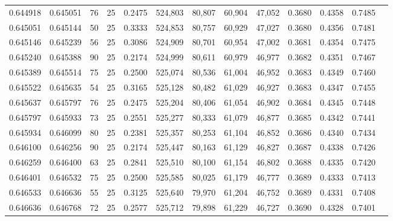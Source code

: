 \begin{tabular}{rrrrrrrrrrrrr}
0.644918 & 0.645051 &    76 &  25 &                                     0.2475 & 524,803 &  80,807 &  60,904 &  47,052 & 0.3680 & 0.4358 & 0.7485 \\
0.645051 & 0.645144 &    50 &  25 &                                     0.3333 & 524,853 &  80,757 &  60,929 &  47,027 & 0.3680 & 0.4356 & 0.7481 \\
0.645146 & 0.645239 &    56 &  25 &                                     0.3086 & 524,909 &  80,701 &  60,954 &  47,002 & 0.3681 & 0.4354 & 0.7475 \\
0.645240 & 0.645388 &    90 &  25 &                                     0.2174 & 524,999 &  80,611 &  60,979 &  46,977 & 0.3682 & 0.4351 & 0.7467 \\
0.645389 & 0.645514 &    75 &  25 &                                     0.2500 & 525,074 &  80,536 &  61,004 &  46,952 & 0.3683 & 0.4349 & 0.7460 \\
0.645522 & 0.645635 &    54 &  25 &                                     0.3165 & 525,128 &  80,482 &  61,029 &  46,927 & 0.3683 & 0.4347 & 0.7455 \\
0.645637 & 0.645797 &    76 &  25 &                                     0.2475 & 525,204 &  80,406 &  61,054 &  46,902 & 0.3684 & 0.4345 & 0.7448 \\
0.645797 & 0.645933 &    73 &  25 &                                     0.2551 & 525,277 &  80,333 &  61,079 &  46,877 & 0.3685 & 0.4342 & 0.7441 \\
0.645934 & 0.646099 &    80 &  25 &                                     0.2381 & 525,357 &  80,253 &  61,104 &  46,852 & 0.3686 & 0.4340 & 0.7434 \\
0.646100 & 0.646256 &    90 &  25 &                                     0.2174 & 525,447 &  80,163 &  61,129 &  46,827 & 0.3687 & 0.4338 & 0.7426 \\
0.646259 & 0.646400 &    63 &  25 &                                     0.2841 & 525,510 &  80,100 &  61,154 &  46,802 & 0.3688 & 0.4335 & 0.7420 \\
0.646401 & 0.646532 &    75 &  25 &                                     0.2500 & 525,585 &  80,025 &  61,179 &  46,777 & 0.3689 & 0.4333 & 0.7413 \\
0.646533 & 0.646636 &    55 &  25 &                                     0.3125 & 525,640 &  79,970 &  61,204 &  46,752 & 0.3689 & 0.4331 & 0.7408 \\
0.646636 & 0.646768 &    72 &  25 &                                     0.2577 & 525,712 &  79,898 &  61,229 &  46,727 & 0.3690 & 0.4328 & 0.7401 \\

\end{tabular}
